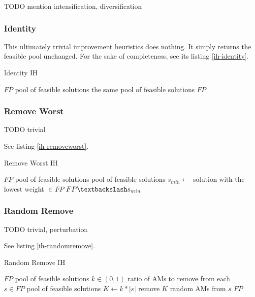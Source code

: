 \documentclass[a4paper,12pt,oneside]{report}
\begin{document}
TODO mention intensification, diversification

\subsubsection{Identity}

This ultimately trivial improvement heuristics does nothing. It simply returns the feasible pool unchanged. For the sake of completeness, see its listing \ref{ih-identity}.

\begin{algorithm}
\caption{Identity IH}
\label{ih-identity}
\begin{algorithmic}
\REQUIRE $FP$ pool of feasible solutions
\ENSURE the same pool of feasible solutions
\RETURN $FP$
\end{algorithmic}
\end{algorithm}

\subsubsection{Remove Worst}

TODO trivial

See listing \ref{ih-removeworst}.

\begin{algorithm}
\caption{Remove Worst IH}
\label{ih-removeworst}
\begin{algorithmic}
\REQUIRE $FP$ pool of feasible solutions
\ENSURE pool of feasible solutions
\STATE $s_{min} \gets $ solution with the lowest weight $\in FP$
\RETURN $FP \textbackslash s_{min}$
\end{algorithmic}
\end{algorithm}

\subsubsection{Random Remove}

TODO trivial, perturbation

See listing \ref{ih-randomremove}.

\begin{algorithm}
\caption{Random Remove IH}
\label{ih-randomremove}
\begin{algorithmic}
\REQUIRE $FP$ pool of feasible solutions
\REQUIRE $k \in (0,1)$ ratio of AMs to remove from each $s \in FP$
\ENSURE pool of feasible solutions
  \STATE $K \gets k * |s|$
  \STATE remove $K$ random AMs from $s$
\ENDFOR
\RETURN $FP$
\end{algorithmic}
\end{algorithm}
\end{document}
